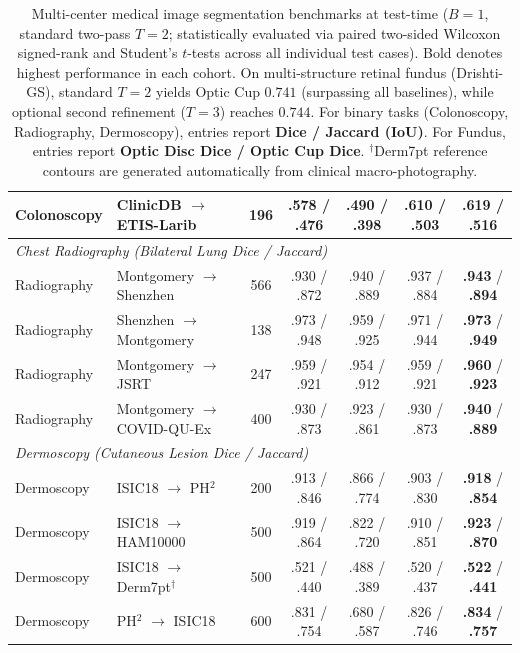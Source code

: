 \documentclass[11pt,a4paper]{article}
\begin{document}
\begin{table}[h]
\begin{tabularx}{\linewidth}{@{}l >{\raggedright\arraybackslash}X c c c c c@{}}
Colonoscopy & ClinicDB $\to$ ETIS-Larib & 196 & .578 / .476 & .490 / .398 & .610 / .503 & \textbf{.619} / \textbf{.516} \\
\midrule
\multicolumn{7}{l}{\textit{Chest Radiography (Bilateral Lung Dice / Jaccard)}} \\
Radiography & Montgomery $\to$ Shenzhen & 566 & .930 / .872 & .940 / .889 & .937 / .884 & \textbf{.943} / \textbf{.894} \\
Radiography & Shenzhen $\to$ Montgomery & 138 & .973 / .948 & .959 / .925 & .971 / .944 & \textbf{.973} / \textbf{.949} \\
Radiography & Montgomery $\to$ JSRT & 247 & .959 / .921 & .954 / .912 & .959 / .921 & \textbf{.960} / \textbf{.923} \\
Radiography & Montgomery $\to$ COVID-QU-Ex & 400 & .930 / .873 & .923 / .861 & .930 / .873 & \textbf{.940} / \textbf{.889} \\
\midrule
\multicolumn{7}{l}{\textit{Dermoscopy (Cutaneous Lesion Dice / Jaccard)}} \\
Dermoscopy & ISIC18 $\to$ PH$^2$ & 200 & .913 / .846 & .866 / .774 & .903 / .830 & \textbf{.918} / \textbf{.854} \\
Dermoscopy & ISIC18 $\to$ HAM10000 & 500 & .919 / .864 & .822 / .720 & .910 / .851 & \textbf{.923} / \textbf{.870} \\
Dermoscopy & ISIC18 $\to$ Derm7pt$^\dagger$ & 500 & .521 / .440 & .488 / .389 & .520 / .437 & \textbf{.522} / \textbf{.441} \\
Dermoscopy & PH$^2$ $\to$ ISIC18 & 600 & .831 / .754 & .680 / .587 & .826 / .746 & \textbf{.834} / \textbf{.757} \\
\bottomrule
\end{tabularx}
\caption{Multi-center medical image segmentation benchmarks at test-time ($B=1$, standard two-pass $T=2$; statistically evaluated via paired two-sided Wilcoxon signed-rank and Student's $t$-tests across all individual test cases). Bold denotes highest performance in each cohort. On multi-structure retinal fundus (Drishti-GS), standard $T=2$ yields Optic Cup $0.741$ (surpassing all baselines), while optional second refinement ($T=3$) reaches $0.744$. For binary tasks (Colonoscopy, Radiography, Dermoscopy), entries report \textbf{Dice / Jaccard (IoU)}. For Fundus, entries report \textbf{Optic Disc Dice / Optic Cup Dice}. $^\dagger$Derm7pt reference contours are generated automatically from clinical macro-photography.}
\label{tab:main}
\end{table}
\end{document}
